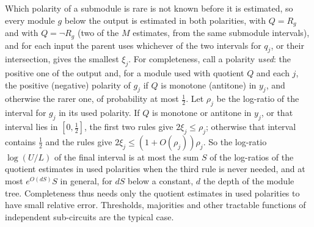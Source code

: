 Which polarity of a submodule is rare is not known before it is estimated, so every
module $g$ below the output is estimated in both polarities, with $Q=R_g$ and with
$Q=\neg R_g$ (two of the $M$ estimates, from the same submodule intervals), and for
each input the parent uses whichever of the two intervals for $q_j$, or their
intersection, gives the smallest $\xi_j$. For completeness, call a polarity
\emph{used}: the positive one of the output and, for a module used with quotient $Q$
and each $j$, the positive (negative) polarity of $g_j$ if $Q$ is monotone (antitone)
in $y_j$, and otherwise the rarer one, of probability at most $\frac12$. Let $\rho_j$ be
the log-ratio of the interval for $g_j$ in its used polarity. If $Q$ is monotone or
antitone in $y_j$, or that interval lies in $[0,\frac12]$, the first two rules give
$2\xi_j\le\rho_j$; otherwise that interval contains $\frac12$ and the rules give
$2\xi_j\le(1+O(\rho_j))\rho_j$. So the log-ratio $\log(U/L)$ of the final interval is
at most the sum $S$ of the log-ratios of the quotient estimates in used polarities
when the third rule is never needed, and at most $e^{O(dS)}S$ in general, for $dS$
below a constant, $d$ the depth of the module tree. Completeness thus needs only the
quotient estimates in used polarities to have small relative error. Thresholds,
majorities and other tractable functions of independent sub-circuits are the typical
case.
